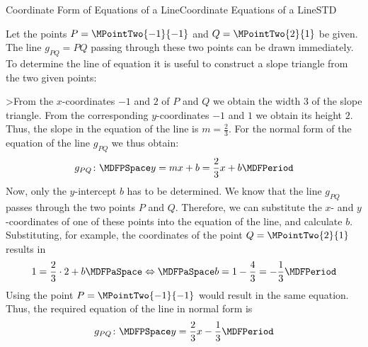 \begin{MXContent}{Coordinate Form of Equations of a Line}{Coordinate Equations of a Line}{STD}
\begin{MExample}
Let the points $P=\MPointTwo{-1}{-1}$ and $Q=\MPointTwo{2}{1}$ be given. The line $g_{P Q}=P Q$ passing through these two points can be 
drawn immediately. To determine the line of equation it is useful to construct a slope triangle from the two given points:
  \begin{center}
\end{center} 

>From the $x$-coordinates $-1$ and $2$ of $P$ and $Q$ we obtain the width $3$ of the slope triangle. From the corresponding $y$-coordinates 
$-1$ and $1$ we obtain its height $2$. Thus, the slope in the equation of the line is $m=\frac{2}{3}$. For the normal form of the equation of 
the line $g_{P Q}$ we thus obtain:
\[
 g_{P Q}\colon\MDFPSpace y=m x+b=\frac{2}{3}x+b\MDFPeriod
\]
Now, only the $y$-intercept $b$ has to be determined. We know that the line $g_{P Q}$ passes through the two points $P$ and $Q$. Therefore, we can 
substitute the $x$- and $y$-coordinates of one of these points into the equation of the line, and calculate $b$. Substituting, for example, 
the coordinates of the point $Q=\MPointTwo{2}{1}$ results in
\[
 1=\frac{2}{3}\cdot 2 + b\MDFPaSpace\Leftrightarrow\MDFPaSpace b=1-\frac{4}{3}=-\frac{1}{3}\MDFPeriod
\]
Using the point $P=\MPointTwo{-1}{-1}$ would result in the same equation. Thus, the required equation of the line in normal form is
\[
 g_{P Q}\colon\MDFPSpace y=\frac{2}{3}x-\frac{1}{3}\MDFPeriod
\]
\end{MExample}


\end{MXContent}
